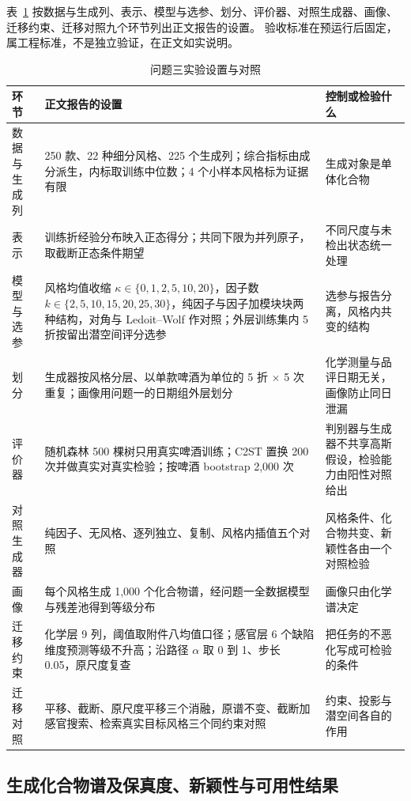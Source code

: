 表~\ref{tab:q3-setup} 按数据与生成列、表示、模型与选参、划分、评价器、对照生成器、画像、迁移约束、迁移对照九个环节列出正文报告的设置。
验收标准在预运行后固定，属工程标准，不是独立验证，在正文如实说明。

\begin{table}[htbp]
\centering\small
\caption{问题三实验设置与对照}
\label{tab:q3-setup}
\begin{tabular}{p{3.0cm}p{5.4cm}p{4.2cm}}
\toprule
环节 & 正文报告的设置 & 控制或检验什么 \\
\midrule
数据与生成列 & 250 款、22 种细分风格、225 个生成列；综合指标由成分派生，内标取训练中位数；4 个小样本风格标为证据有限 & 生成对象是单体化合物 \\
\addlinespace
表示 & 训练折经验分布映入正态得分；共同下限为并列原子，取截断正态条件期望 & 不同尺度与未检出状态统一处理 \\
\addlinespace
模型与选参 & 风格均值收缩 $\kappa\in\{0,1,2,5,10,20\}$，因子数 $k\in\{2,5,10,15,20,25,30\}$，纯因子与因子加模块块两种结构，对角与 Ledoit--Wolf 作对照；外层训练集内 5 折按留出潜空间评分选参 & 选参与报告分离，风格内共变的结构 \\
\addlinespace
划分 & 生成器按风格分层、以单款啤酒为单位的 5 折 $\times$ 5 次重复；画像用问题一的日期组外层划分 & 化学测量与品评日期无关，画像防止同日泄漏 \\
\addlinespace
评价器 & 随机森林 500 棵树只用真实啤酒训练；C2ST 置换 200 次并做真实对真实检验；按啤酒 bootstrap 2,000 次 & 判别器与生成器不共享高斯假设，检验能力由阳性对照给出 \\
\addlinespace
对照生成器 & 纯因子、无风格、逐列独立、复制、风格内插值五个对照 & 风格条件、化合物共变、新颖性各由一个对照检验 \\
\addlinespace
画像 & 每个风格生成 1,000 个化合物谱，经问题一全数据模型与残差池得到等级分布 & 画像只由化学谱决定 \\
\addlinespace
迁移约束 & 化学层 9 列，阈值取附件八均值口径；感官层 6 个缺陷维度预测等级不升高；沿路径 $\alpha$ 取 0 到 1、步长 0.05，原尺度复查 & 把任务的不恶化写成可检验的条件 \\
\addlinespace
迁移对照 & 平移、截断、原尺度平移三个消融，原谱不变、截断加感官搜索、检索真实目标风格三个同约束对照 & 约束、投影与潜空间各自的作用 \\
\bottomrule
\end{tabular}
\end{table}

\subsection{生成化合物谱及保真度、新颖性与可用性结果}

